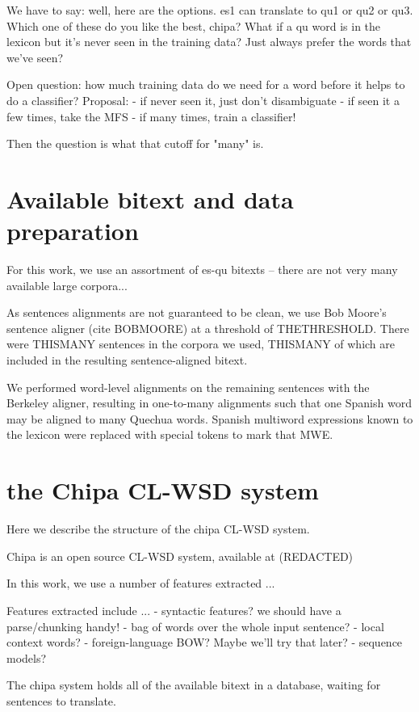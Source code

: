 \documentclass[10pt, a4paper]{article}
\begin{document}
We have to say: well, here are the options. es1 can translate to qu1 or qu2 or qu3. Which one of these do you like the best, chipa?
What if a qu word is in the lexicon but it's never seen in the training data? Just always prefer the words that we've seen?


Open question: how much training data do we need for a word before it helps to do a classifier?
Proposal:
- if never seen it, just don't disambiguate
- if seen it a few times, take the MFS
- if many times, train a classifier!


Then the question is what that cutoff for "many" is.






\section{Available bitext and data preparation}
For this work, we use an assortment of es-qu bitexts -- there are not very many available large corpora...


As sentences alignments are not guaranteed to be clean, we use Bob Moore's sentence aligner (cite BOBMOORE) at a threshold of THETHRESHOLD. There were THISMANY sentences in the corpora we used, THISMANY of which are included in the resulting sentence-aligned bitext.


We performed word-level alignments on the remaining sentences with the Berkeley aligner, resulting in one-to-many alignments such that one Spanish word may be aligned to many Quechua words. Spanish multiword expressions known to the lexicon were replaced with special tokens to mark that MWE.


\section{the Chipa CL-WSD system}
Here we describe the structure of the chipa CL-WSD system.


Chipa is an open source CL-WSD system, available at (REDACTED)


In this work, we use a number of features extracted ...


Features extracted include ...
- syntactic features? we should have a parse/chunking handy!
- bag of words over the whole input sentence?
- local context words?
- foreign-language BOW? Maybe we'll try that later?
- sequence models?


The chipa system holds all of the available bitext in a database, waiting for sentences to translate.
\end{document}
